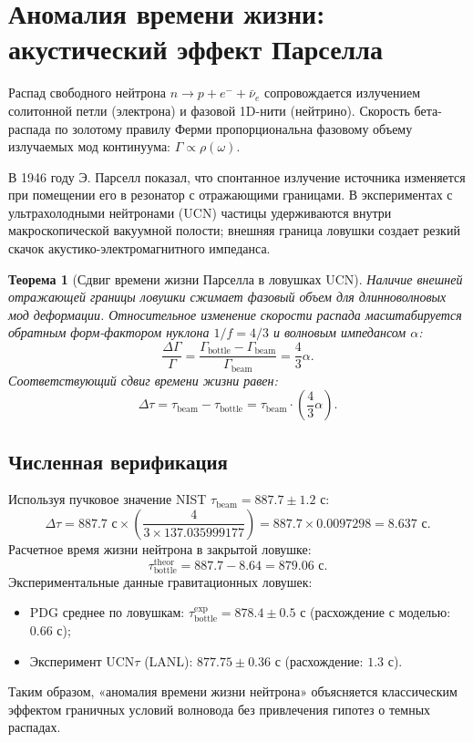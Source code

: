 \documentclass[11pt,a4paper]{article}
\newtheorem{theorem}{Теорема}
\theoremstyle{definition}
\theoremstyle{remark}
\begin{document}
\section{Аномалия времени жизни: акустический эффект Парселла}
Распад свободного нейтрона $n \to p + e^- + \bar{\nu}_e$ сопровождается излучением солитонной петли (электрона) и фазовой 1D-нити (нейтрино). Скорость бета-распада по золотому правилу Ферми пропорциональна фазовому объему излучаемых мод континуума: $\Gamma \propto \rho(\omega)$.

В 1946 году Э. Парселл показал, что спонтанное излучение источника изменяется при помещении его в резонатор с отражающими границами. В экспериментах с ультрахолодными нейтронами (UCN) частицы удерживаются внутри макроскопической вакуумной полости; внешняя граница ловушки создает резкий скачок акустико-электромагнитного импеданса.

\begin{theorem}[Сдвиг времени жизни Парселла в ловушках UCN]
Наличие внешней отражающей границы ловушки сжимает фазовый объем для длинноволновых мод деформации. Относительное изменение скорости распада масштабируется обратным форм-фактором нуклона $1/f = 4/3$ и волновым импедансом $\alpha$:
\begin{equation}
    \frac{\Delta \Gamma}{\Gamma} = \frac{\Gamma_{\mathrm{bottle}} - \Gamma_{\mathrm{beam}}}{\Gamma_{\mathrm{beam}}} = \frac{4}{3}\alpha.
\end{equation}
Соответствующий сдвиг времени жизни равен:
\begin{equation}
    \Delta \tau = \tau_{\mathrm{beam}} - \tau_{\mathrm{bottle}} = \tau_{\mathrm{beam}} \cdot \left( \frac{4}{3}\alpha \right).
\end{equation}
\end{theorem}

\subsection{Численная верификация}
Используя пучковое значение NIST $\tau_{\mathrm{beam}} = 887.7 \pm 1.2\text{ с}$:
\begin{equation}
    \Delta \tau = 887.7\text{ с} \times \left( \frac{4}{3 \times 137.035999177} \right) = 887.7 \times 0.0097298 = \mathbf{8.637\text{ с}}.
\end{equation}
Расчетное время жизни нейтрона в закрытой ловушке:
\begin{equation}
    \tau_{\mathrm{bottle}}^{\mathrm{theor}} = 887.7 - 8.64 = \mathbf{879.06\text{ с}}.
\end{equation}
Экспериментальные данные гравитационных ловушек:
\begin{itemize}
    \item PDG среднее по ловушкам: $\tau_{\mathrm{bottle}}^{\mathrm{exp}} = 878.4 \pm 0.5\text{ с}$ (расхождение с моделью: $0.66\text{ с}$);
    \item Эксперимент $\mathrm{UCN}\tau$ (LANL): $877.75 \pm 0.36\text{ с}$ (расхождение: $1.3\text{ с}$).
\end{itemize}
Таким образом, «аномалия времени жизни нейтрона» объясняется классическим эффектом граничных условий волновода без привлечения гипотез о темных распадах.
\end{document}
